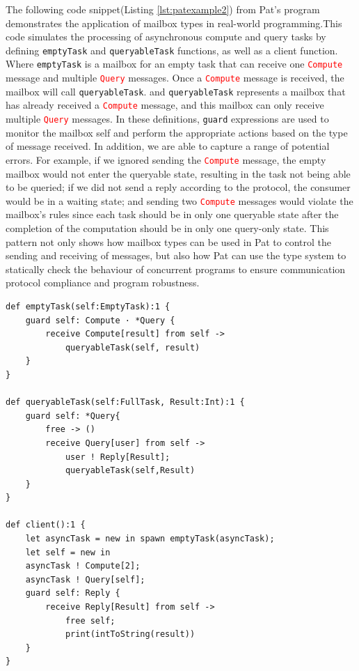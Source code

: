 \documentclass{l4proj}
\begin{document}
The following code snippet(Listing \ref{lst:patexample2}) from Pat's program demonstrates the application of mailbox types in real-world programming.This code simulates the processing of asynchronous compute and query tasks by defining \texttt{emptyTask} and \texttt{queryableTask} functions, as well as a client function. Where \texttt{emptyTask} is a mailbox for an empty task that can receive one \textcolor{red}{\texttt{Compute}} message and multiple \textcolor{red}{\texttt{Query}} messages. Once a \textcolor{red}{\texttt{Compute}} message is received, the mailbox will call \texttt{queryableTask}. and \texttt{queryableTask} represents a mailbox that has already received a \textcolor{red}{\texttt{Compute}} message, and this mailbox can only receive multiple \textcolor{red}{\texttt{Query}} messages. In these definitions, \texttt{guard} expressions are used to monitor the mailbox self and perform the appropriate actions based on the type of message received. In addition, we are able to capture a range of potential errors. For example, if we ignored sending the \textcolor{red}{\texttt{Compute}} message, the empty mailbox would not enter the queryable state, resulting in the task not being able to be queried; if we did not send a reply according to the protocol, the consumer would be in a waiting state; and sending two \textcolor{red}{\texttt{Compute}} messages would violate the mailbox's rules since each task should be in only one queryable state after the completion of the computation should be in only one query-only state. This pattern not only shows how mailbox types can be used in Pat to control the sending and receiving of messages, but also how Pat can use the type system to statically check the behaviour of concurrent programs to ensure communication protocol compliance and program robustness.

\noindent\begin{minipage}{\linewidth}
\begin{lstlisting}[caption={Implementing concurrent program for asynchronous task processing and result querying adapted from \protect\cite{fowler_2023_special}}, label={lst:patexample2}]
def emptyTask(self:EmptyTask):1 {
    guard self: Compute · *Query {
        receive Compute[result] from self -> 
            queryableTask(self, result)
    }
}

def queryableTask(self:FullTask, Result:Int):1 {
    guard self: *Query{
        free -> ()
        receive Query[user] from self ->
            user ! Reply[Result];
            queryableTask(self,Result)
    }
}

def client():1 {
    let asyncTask = new in spawn emptyTask(asyncTask);
    let self = new in 
    asyncTask ! Compute[2];
    asyncTask ! Query[self];
    guard self: Reply {
        receive Reply[Result] from self ->
            free self;
            print(intToString(result))
    }
}

\end{lstlisting}
\end{minipage}
\end{document}
